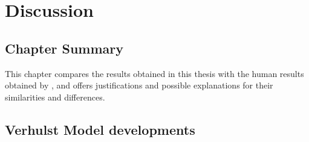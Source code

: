 \chapter{Discussion}
\label{chapter:Discussion}
\thispagestyle{myheadings}

\graphicspath{{6_Discussion/Figures/}}
\section{Chapter Summary} %
\label{sec:chapter_summary}
This chapter compares the results obtained in this thesis with the human results obtained by \citeauthor{Mehraei2016Auditory}, and offers justifications and possible explanations for their similarities and differences.

\section{Verhulst Model developments} %
\label{sec:verhulst_model_developments}

